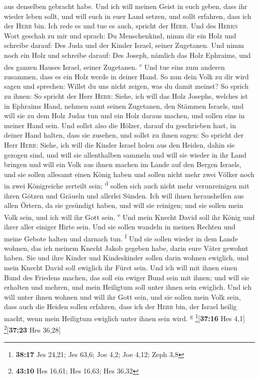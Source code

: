 aus denselben gebracht habe.  Und ich will meinen Geist
in euch geben, dass ihr wieder leben sollt, und will euch in euer Land
setzen, und sollt erfahren, dass ich der \textsc{Herr} bin. Ich rede es
und tue es auch, spricht der \textsc{Herr}.  Und des
\textsc{Herrn} Wort geschah zu mir und sprach:  Du
Menschenkind, nimm dir ein Holz und schreibe darauf: Des Juda und der
Kinder Israel, seiner Zugetanen. Und nimm noch ein Holz und schreibe
darauf: Des Joseph, nämlich das Holz Ephraims, und des ganzen Hauses
Israel, seiner Zugetanen. \textsuperscript{c}  Und tue
eins zum anderen zusammen, dass es ein Holz werde in deiner Hand.
 So nun dein Volk zu dir wird sagen und sprechen: Willst
du uns nicht zeigen, was du damit meinst?  So sprich zu
ihnen: So spricht der Herr \textsc{Herr}: Siehe, ich will das Holz
Josephs, welches ist in Ephraims Hand, nehmen samt seinen Zugetanen, den
Stämmen Israels, und will sie zu dem Holz Judas tun und ein Holz daraus
machen, und sollen eins in meiner Hand sein.  Und sollst
also die Hölzer, darauf du geschrieben hast, in deiner Hand halten, dass
sie zusehen,  und sollst zu ihnen sagen: So spricht der
Herr \textsc{Herr}: Siehe, ich will die Kinder Israel holen aus den
Heiden, dahin sie gezogen sind, und will sie allenthalben sammeln und
will sie wieder in ihr Land bringen  und will ein Volk
aus ihnen machen im Lande auf den Bergen Israels, und sie sollen
allesamt einen König haben und sollen nicht mehr zwei Völker noch in
zwei Königreiche zerteilt sein; \textsuperscript{d} 
sollen sich auch nicht mehr verunreinigen mit ihren Götzen und Gräueln
und allerlei Sünden. Ich will ihnen heraushelfen aus allen Örtern, da
sie gesündigt haben, und will sie reinigen; und sie sollen mein Volk
sein, und ich will ihr Gott sein. \textsuperscript{e} 
Und mein Knecht David soll ihr König und ihrer aller einiger Hirte sein.
Und sie sollen wandeln in meinen Rechten und meine Gebote halten und
darnach tun. \textsuperscript{f}  Und sie sollen wieder
in dem Lande wohnen, das ich meinem Knecht Jakob gegeben habe, darin
eure Väter gewohnt haben. Sie und ihre Kinder und Kindeskinder sollen
darin wohnen ewiglich, und mein Knecht David soll ewiglich ihr Fürst
sein.  Und ich will mit ihnen einen Bund des Friedens
machen, das soll ein ewiger Bund sein mit ihnen; und will sie erhalten
und mehren, und mein Heiligtum soll unter ihnen sein ewiglich.
 Und ich will unter ihnen wohnen und will ihr Gott sein,
und sie sollen mein Volk sein,  dass auch die Heiden
sollen erfahren, dass ich der \textsc{Herr} bin, der Israel heilig
macht, wenn mein Heiligtum ewiglich unter ihnen sein wird.
\textsuperscript{g} \footnote{\textbf{38:17} Jes 24,21; Jes 63,6; Joe
  4,2; Joe 4,12; Zeph 3,8}{[}\textbf{37:16} Hes 4,1{]}
\footnote{\textbf{43:10} Hes 16,61; Hes 16,63; Hes 36,32}{[}\textbf{37:23}
Hes 36,28{]}

